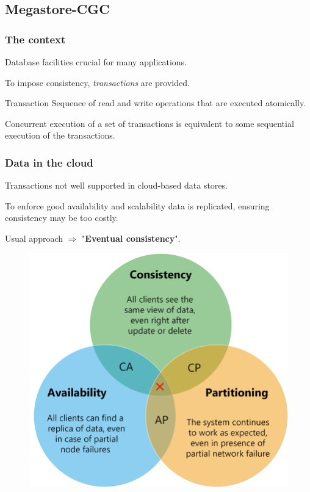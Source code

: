 \documentclass{beamer}
\begin{document}
\subsection{Megastore-CGC}
\begin{frame}
    \frametitle{The context}

    Database facilities crucial for many applications.

    \bigskip
    To impose consistency, \emph{transactions} are provided. 
    
    \bigskip
    \begin{block}{Transaction}
           Sequence of read and write operations that are executed atomically. 
    \end{block}

    \bigskip
    Concurrent execution of a set of transactions is equivalent to some sequential execution of the transactions.
\end{frame}
\begin{frame}
    
    \frametitle{Data in the cloud}
    Transactions not well supported in cloud-based data stores.

    \bigskip
    To enforce good availability and scalability data is replicated, ensuring consistency may be too costly.

    \bigskip
    Usual approach $\Rightarrow$ "\textbf{Eventual consistency}".
\begin{figure}
    \includegraphics[width=.7\textwidth,height = .5\textheight, keepaspectratio]{img/cap.png}
\end{figure}
\end{frame}
\end{document}
